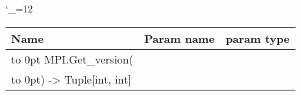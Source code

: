 \begingroup \catcode`\_=12 \tt
\begin{tabular}{lll}
\toprule
\textrm{Name}&\textrm{Param name}&\textrm{param type}\\
\midrule
\hbox to 0pt {MPI.Get_version(\hss}\\
\hbox to 0pt{) -> Tuple[int, int]\hss}\\
\bottomrule
\end{tabular}
\endgroup
